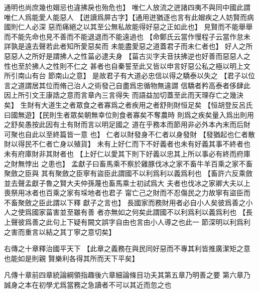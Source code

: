 \documentclass{zhvt-classic}
\begin{document}
    通明也尚庶幾也媢忌也違拂戾也殆危也】
唯仁人放流之迸諸四夷不與同中國此謂唯仁人爲能愛人能惡人
  【迸讀爲屏古字】\zhvph【通用迸猶逐也言有此媢疾之人妨賢而病國則仁人必深
    惡而痛絕之以其至公無私故能得好惡之正如此也】
見賢而不能舉舉而不能先命也見不善而不能退退而不能遠過也
  【命鄭氏云當作慢程子云當作怠未詳孰是遠去聲若此者知所愛惡矣而
    未能盡愛惡之道蓋君子而未仁者也】
好人之所惡惡人之所好是謂拂人之性菑必逮夫身
  【菑古災字夫音扶拂逆也好善而惡惡人之性也至於拂人之性則不仁之
    甚者也自秦誓至此又皆以申言好惡公私之極以明上文所引南山有台
    節南山之意】
是故君子有大道必忠信以得之驕泰以失之
  【君子以位言之道謂居其位而脩己治人之術發己自盡爲忠循物無違謂
    信驕者矜高泰者侈肆此因上所引文王康誥之意而言章內三言得失
    而語益加切蓋至此而天理存亡之幾決矣】
生財有大道生之者眾食之者寡爲之者疾用之者舒則財恒足矣
  【恒胡登反呂氏曰國無遊】\zhvph【民則生者眾矣朝無幸位則食者寡矣不奪農時
    則爲之疾矣量入爲出則用之舒矣愚按此因有土有財而言以明足國之
    道在乎務本而節用非必外本內末而后財可聚也自此以至終篇皆一意
    也】
仁者以財發身不仁者以身發財
  【發猶起也仁者散財以得民不仁者亡身以殖貨】
未有上好仁而下不好義者也未有好義其事不終者也未有府庫財非其財者也
  【上好仁以愛其下則下好義以忠其上所以事必有終而府庫之財無悖出
    之患也】
孟獻子曰畜馬乘不察於雞豚伐冰之家不畜牛羊百乘之家不畜聚斂之臣與
其有聚斂之臣寧有盜臣此謂國不以利爲利以義爲利也
  【畜許六反乘斂並去聲孟獻子魯之賢大夫仲孫蔑也畜馬乘士初試爲大
    夫者也伐冰之家卿大夫以上喪祭用冰者也百乘之家有埰地者也君子
    甯亡己之財而不忍傷民之力故寧有盜臣而不畜聚斂之臣此謂以下釋
    獻子之言也】
長國家而務財用者必自小人矣彼爲善之小人之使爲國家菑害並至雖有善
者亦無如之何矣此謂國不以利爲利以義爲利也
  【長上聲彼爲善之此句上下疑有闕文誤字自由也言由小人導之也此一
    節深明以利爲利之害而重言以結之其丁寧之意切矣】

\begin{preface}
右傳之十章釋治國平天下
  【此章之義務在與民同好惡而不專其利皆推廣潔矩之意也能如是則親
    賢樂利各得其所而天下平矣】

凡傳十章前四章統論綱領指趣後六章細論條目功夫其第五章乃明善之要
第六章乃誠身之本在初學尤爲當務之急讀者不可以其近而忽之也
\end{preface}
\end{document}
